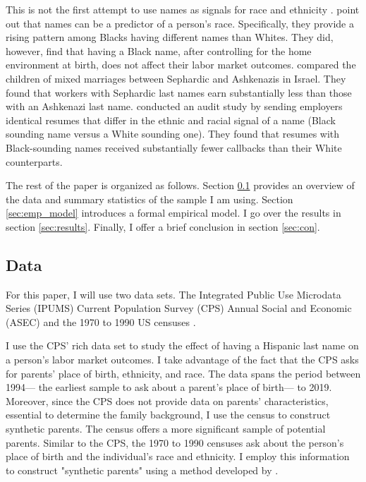 \documentclass[12pt, fullpage]{article}
\begin{document}
This is not the first attempt to use names as signals for race and ethnicity \citep{fryer2004causes, rubinstein2014pride, bertrand2004emily}. \citet{fryer2004causes} point out that names can be a predictor of a person's race. Specifically, they provide a rising pattern among Blacks having different names than Whites. They did, however, find that having a Black name, after controlling for the home environment at birth, does not affect their labor market outcomes. \citet{rubinstein2014pride} compared the children of mixed marriages between Sephardic and Ashkenazis in Israel. They found that workers with Sephardic last names earn substantially less than those with an Ashkenazi last name. \citet{bertrand2004emily} conducted an audit study by sending employers identical resumes that differ in the ethnic and racial signal of a name (Black sounding name versus a White sounding one). They found that resumes with Black-sounding names received substantially fewer callbacks than their White counterparts. 

The rest of the paper is organized as follows. Section \ref{sec:data} provides an overview of the data and summary statistics of the sample I am using. Section \ref{sec:emp_model} introduces a formal empirical model. I go over the results in section \ref{sec:results}. Finally, I offer a brief conclusion in section \ref{sec:con}.

\subsection{Data}\label{sec:data}

For this paper, I will use two data sets. The Integrated Public Use Microdata Series (IPUMS) Current Population Survey (CPS) Annual Social and Economic (ASEC) \citep{cps2019} and the 1970 to 1990 US censuses \citep{acs2019}. 

I use the CPS' rich data set to study the effect of having a Hispanic last name on a person's labor market outcomes. I take advantage of the fact that the CPS asks for parents' place of birth, ethnicity, and race. The data spans the period between 1994--- the earliest sample to ask about a parent's place of birth--- to 2019. Moreover, since the CPS does not provide data on parents' characteristics, essential to determine the family background, I use the census to construct synthetic parents. The census offers a more significant sample of potential parents. Similar to the CPS, the 1970 to 1990 censuses ask about the person's place of birth and the individual's race and ethnicity. I employ this information to construct "synthetic parents" using a method developed by \citet{rubinstein2014pride}. 
\end{document}
